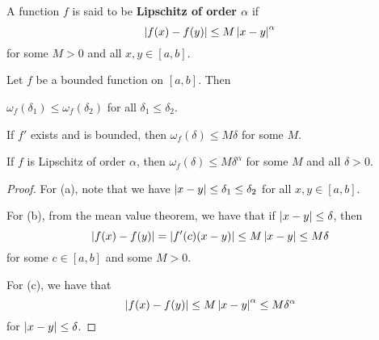 \begin{definition}
    A function $f$ is said to be \textbf{Lipschitz of order $\alpha$} if 
    \begin{equation*}
        \left\lvert {f(x) - f(y)} \right\rvert\leq M\left\lvert {x-y} \right\rvert^\alpha
    \end{equation*}
    for some $M>0$ and all $x,y\in[a,b]$.
\end{definition}

\begin{proposition}
    Let $f$ be a bounded function on $[a,b]$. Then 
    \begin{thmenum}
        \item $\omega_f(\delta_1)\leq \omega_f(\delta_2)$ for all $\delta_1\leq\delta_2$. 
        \item If $f'$ exists and is bounded, then $\omega_f(\delta)\leq M\delta$ for some $M$. 
        \item If $f$ is Lipschitz of order $\alpha$, then $\omega_f(\delta)\leq M\delta^\alpha$ for some $M$ and all $\delta>0$.
    \end{thmenum}
\end{proposition}
\begin{proof}
    For (a), note that we have $\left\lvert {x-y} \right\rvert\leq\delta_1\leq\delta_2$ for all $x,y\in[a,b]$.
    
    For (b), from the mean value theorem, we have that if $\left\lvert {x-y} \right\rvert\leq\delta$, then
    \begin{equation*}
        \left\lvert {f(x) - f(y)} \right\rvert = \left\lvert {f'(c)(x-y)} \right\rvert\leq M\left\lvert {x-y} \right\rvert\leq M\delta
    \end{equation*}
    for some $c\in[a,b]$ and some $M>0$. 
    
    For (c), we have that 
    \begin{equation*}
        \left\lvert {f(x) - f(y)} \right\rvert\leq M\left\lvert {x-y} \right\rvert^\alpha\leq M\delta^\alpha
    \end{equation*}
    for $\left\lvert {x-y} \right\rvert\leq\delta$.
\end{proof}

